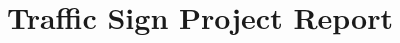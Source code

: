 \documentclass[]{article}
\title{Traffic Sign Project Report}
\begin{document}
\maketitle

\section{}
\end{document}

